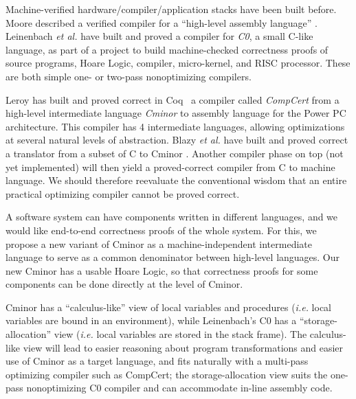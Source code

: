 \documentclass{llncs}
\newcommand{\cminor}{Cminor}
\newcommand{\compcert}{CompCert}
\begin{document}
Machine-verified hardware/compiler/application stacks have been built
before.  Moore described a verified compiler
for a ``high-level assembly language'' \cite{moore89}.
Leinenbach \emph{et al.} \cite{leinenbach05} have built
and proved a compiler for \emph{C0}, a small C-like language, 
as part of a project to build machine-checked
correctness proofs 
of source programs, Hoare Logic, compiler, micro-kernel, and RISC processor.
These are both simple one- or two-pass
nonoptimizing compilers.

Leroy \cite{leroy06} has built and proved correct in Coq~\cite{COQ-www}
a compiler called \emph{CompCert} from a high-level intermediate language \emph{\cminor}
to assembly language for the Power PC architecture.
This compiler has 4 intermediate languages, allowing
optimizations at several natural levels of abstraction.
Blazy \emph{et al.} have built and proved correct
a translator from a subset of C to \cminor{} \cite{blazy06:fm}.
Another compiler phase on top (not yet implemented)
will then yield a
proved-correct compiler from C to machine language.
We should therefore reevaluate the conventional wisdom that
an entire practical optimizing compiler cannot be proved correct.

A software system can have
components written in different languages, and we would like
end-to-end correctness proofs of the whole system.  
For this, we propose a new variant of \cminor{} as a machine-independent intermediate language to serve
as a common denominator between high-level languages.
Our new \cminor{} has a usable Hoare Logic, so that 
correctness proofs for some components can be done directly at the level of \cminor.

\cminor{} has a
``calculus-like'' view of local variables and procedures
(\textit{i.e.} local variables are bound in an environment), 
while Leinenbach's C0 has a ``storage-allocation'' view (\textit{i.e.} local variables are stored in the stack frame).  
The calculus-like view
will lead to easier reasoning about program transformations
and easier use of \cminor{} as a target language, and fits naturally
with a multi-pass optimizing compiler such as \compcert;
the storage-allocation view suits the 
one-pass nonoptimizing C0 compiler and can accommodate in-line assembly code.
\end{document}
